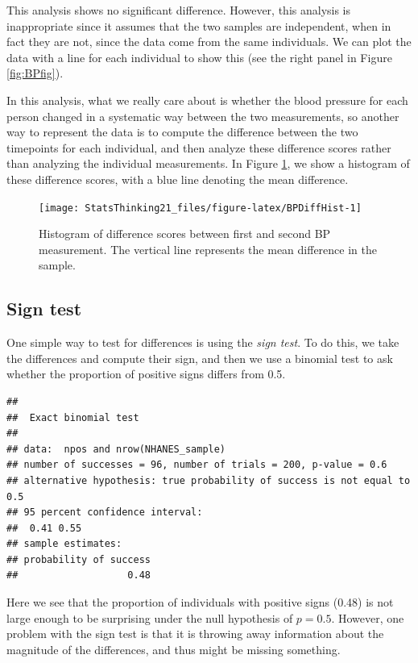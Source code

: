 \documentclass[
  12pt,
]{book}
\begin{document}
This analysis shows no significant difference. However, this analysis is inappropriate since it assumes that the two samples are independent, when in fact they are not, since the data come from the same individuals. We can plot the data with a line for each individual to show this (see the right panel in Figure \ref{fig:BPfig}).

In this analysis, what we really care about is whether the blood pressure for each person changed in a systematic way between the two measurements, so another way to represent the data is to compute the difference between the two timepoints for each individual, and then analyze these difference scores rather than analyzing the individual measurements. In Figure \ref{fig:BPDiffHist}, we show a histogram of these difference scores, with a blue line denoting the mean difference.

\begin{figure}
\texttt{[image: StatsThinking21\_files/figure-latex/BPDiffHist-1]} \caption{Histogram of difference scores between first and second BP measurement. The vertical line represents the mean difference in the sample.}\label{fig:BPDiffHist}
\end{figure}

\hypertarget{sign-test}{%
\subsection{Sign test}\label{sign-test}}

One simple way to test for differences is using the \emph{sign test}. To do this, we take the differences and compute their sign, and then we use a binomial test to ask whether the proportion of positive signs differs from 0.5.

\begin{verbatim}
## 
##  Exact binomial test
## 
## data:  npos and nrow(NHANES_sample)
## number of successes = 96, number of trials = 200, p-value = 0.6
## alternative hypothesis: true probability of success is not equal to 0.5
## 95 percent confidence interval:
##  0.41 0.55
## sample estimates:
## probability of success 
##                   0.48
\end{verbatim}

Here we see that the proportion of individuals with positive signs (0.48) is not large enough to be surprising under the null hypothesis of \(p=0.5\). However, one problem with the sign test is that it is throwing away information about the magnitude of the differences, and thus might be missing something.
\end{document}
